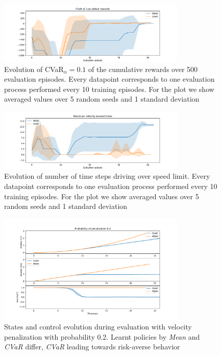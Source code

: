 \begin{figure}[ht]
        \centering
        \includegraphics[width=0.8\textwidth]{images/Car/CVAR/cvar_train_withstds.pdf}
        \caption{Evolution of CVaR$_\alpha=0.1$ of the cumulative rewards over 500 evaluation episodes.
        Every datapoint corresponds
        to one evaluation process performed every 10 training episodes.
        For the plot we
        show averaged values over 5 random seeds and 1 standard deviation}
        \label{fig:cvar_car}
    
\end{figure}

\begin{figure}[ht]
        \centering
        \includegraphics[width=0.8\textwidth]{images/Car/CVAR/times_exceedvel_withstds.pdf}
        \caption{Evolution of number of time steps driving over speed limit.
        Every datapoint corresponds
        to one evaluation process performed every 10 training episodes. For the plot we
        show averaged values over 5 random seeds and 1 standard deviation}
        \label{fig:maxveltimes_car}
    
\end{figure}

\begin{figure}[ht]
        \centering
        \includegraphics[width=0.8\textwidth]{images/Car/CVAR/Trajectory_withstds_penal.pdf}
        \caption{States and control evolution during evaluation with velocity penalization
        with probability 0.2.
        Learnt policies by \textit{Mean} and \textit{CVaR} differ, \textit{CVaR} leading
        towards risk-averse behavior}
        \label{fig:traj_probpenal0.2}
    
\end{figure}


